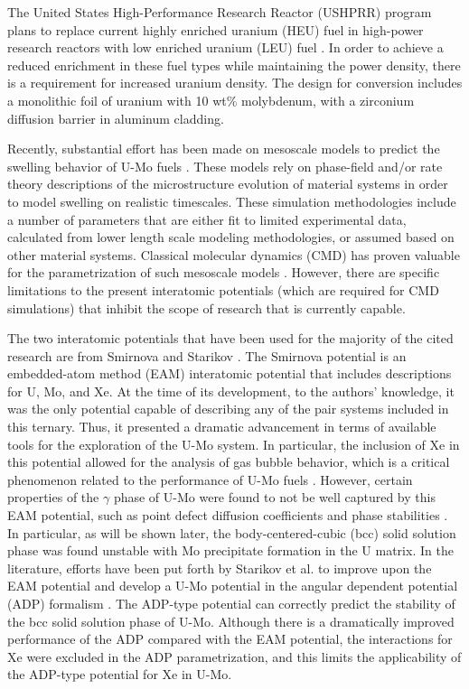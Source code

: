 \documentclass[review]{elsarticle}
\begin{document}
The United States High-Performance Research Reactor (USHPRR) program plans to replace current highly enriched uranium (HEU) fuel in high-power research reactors with low enriched uranium (LEU) fuel \cite{snelgrove1997}. In order to achieve a reduced enrichment in these fuel types while maintaining the power density, there is a requirement for increased uranium density. The design for conversion includes a monolithic foil of uranium with 10 wt\% molybdenum, with a zirconium diffusion barrier in aluminum cladding. 

Recently, substantial effort has been made on mesoscale models to predict the swelling behavior of U-Mo fuels \cite{liang2018, liang2018a, liang2017, liang2016, ye2018, hu2017a, hu2016, hu2016a}. These models rely on phase-field and/or rate theory descriptions of the microstructure evolution of material systems in order to model swelling on realistic timescales. These simulation methodologies include a number of parameters that are either fit to limited experimental data, calculated from lower length scale modeling methodologies, or assumed based on other material systems. Classical molecular dynamics (CMD) has proven valuable for the parametrization of such mesoscale models \cite{Park2023, Park2021, BeelerMRSA, BeelerRDD, Beeler2020}. However, there are specific limitations to the present interatomic potentials (which are required for CMD simulations) that inhibit the scope of research that is currently capable. 

The two interatomic potentials that have been used for the majority of the cited research are from Smirnova \cite{smirnovaUMoXe} and Starikov \cite{starikov2018}. The Smirnova potential is an embedded-atom method (EAM) \cite{daw1984,daw1993} interatomic potential that includes descriptions for U, Mo, and Xe. At the time of its development, to the authors' knowledge, it was the only potential capable of describing any of the pair systems included in this ternary. Thus, it presented a dramatic advancement in terms of available tools for the exploration of the U-Mo system. In particular, the inclusion of Xe in this potential allowed for the analysis of gas bubble behavior, which is a critical phenomenon related to the performance of U-Mo fuels \cite{kim2013A,meyer2014}. However, certain properties of the $\gamma$ phase of U-Mo were found to not be well captured by this EAM potential, such as point defect diffusion coefficients and phase stabilities \cite{smirnovaUMoXe,starikov2018}. In particular, as will be shown later, the body-centered-cubic (bcc) solid solution phase was found unstable with Mo precipitate formation in the U matrix. In the literature, efforts have been put forth by Starikov et al. \cite{starikov2018} to improve upon the EAM potential and develop a U-Mo potential in the angular dependent potential (ADP) formalism \cite{mishin2005}. The ADP-type potential can correctly predict the stability of the bcc solid solution phase of U-Mo. Although there is a dramatically improved performance of the ADP compared with the EAM potential, the interactions for Xe were excluded in the ADP parametrization, and this limits the applicability of the ADP-type potential for Xe in U-Mo.
\end{document}
